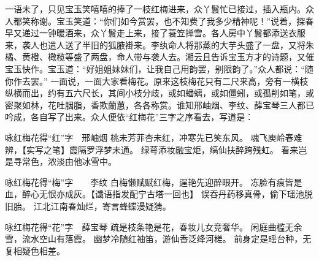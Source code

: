 \documentclass[12pt,oneside]{book}
\begin{document}
一语未了，只见宝玉笑嘻嘻的捧了一枝红梅进来，众丫鬟忙已接过，插入瓶内。众人都笑称谢。宝玉笑道：“你们如今赏罢，也不知费了我多少精神呢！”说着，探春早又递过一钟暖酒来，众丫鬟走上来，接了蓑笠掸雪。各人房中丫鬟都添送衣服来，袭人也遣人送了半旧的狐腋褂来。李纨命人将那蒸的大芋头盛了一盘，又将朱橘、黄橙、橄榄等盛了两盘，命人带与袭人去。湘云且告诉宝玉方才的诗题，又催宝玉快作。宝玉道：“好姐姐妹妹们，让我自己用韵罢，别限韵了。”众人都说：“随你作去罢。”
一面说，一面大家看梅花。原来这枝梅花只有二尺来高，旁有一横枝纵横而出，约有五六尺长，其间小枝分歧，或如蟠螭，或如僵蚓，或孤削如笔，或密聚如林，花吐胭脂，香欺蘭蕙，各各称赏。谁知邢岫烟、李纹、薛宝琴三人都已吟成，各自写了出来。众人便依“红梅花”三字之序看去，写道是：

咏红梅花得“红”字　邢岫烟
桃未芳菲杏未红，冲寒先已笑东风。
魂飞庾岭春难辨，【实写之笔】霞隔罗浮梦未通。
绿萼添妆融宝炬，缟仙扶醉跨残虹。
看来岂是寻常色，浓淡由他冰雪中。

咏红梅花得“梅”字　　李纹
白梅懒赋赋红梅，逞艳先迎醉眼开。
冻脸有痕皆是血，醉心无恨亦成灰。【谶语指发配宁古塔一回也】
误吞丹药移真骨，偷下瑶池脱旧胎。
江北江南春灿烂，寄言蜂蝶漫疑猜。

咏红梅花得“花”字　薛宝琴
疏是枝条艳是花，春妆儿女竞奢华。
闲庭曲槛无余雪，流水空山有落霞。
幽梦冷随红袖笛，游仙香泛绛河槎。
前身定是瑶台种，无复相疑色相差。
\end{document}
